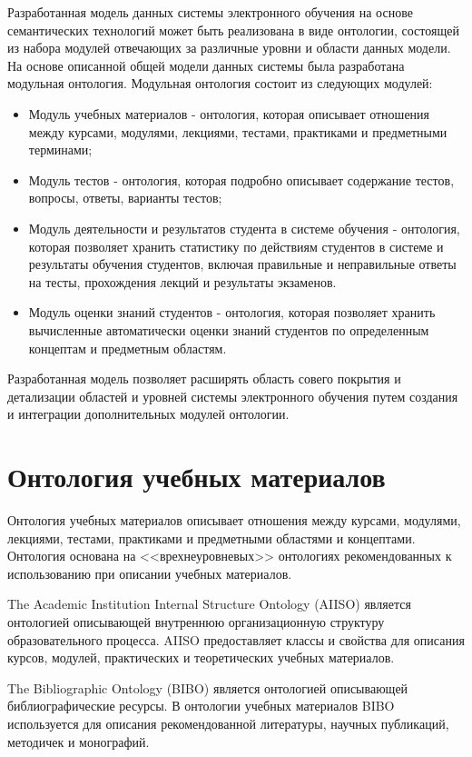 Разработанная модель данных системы электронного обучения на основе семантических технологий может быть реализована в виде онтологии, состоящей из набора модулей отвечающих за различные уровни и области данных модели. На основе описанной общей модели данных системы была разработана модульная онтология. Модульная онтология состоит из следующих модулей:

\begin{itemize}
\item Модуль учебных материалов - онтология, которая описывает отношения между курсами, модулями, лекциями, тестами, практиками и предметными терминами;
\item Модуль тестов - онтология, которая подробно описывает содержание тестов, вопросы, ответы, варианты тестов;
\item Модуль деятельности и результатов студента в системе обучения - онтология, которая позволяет хранить статистику по действиям студентов в системе и результаты обучения студентов, включая правильные и неправильные ответы на тесты, прохождения лекций и результаты экзаменов.
\item Модуль оценки знаний студентов - онтология, которая позволяет хранить вычисленные автоматически оценки знаний студентов по определенным концептам и предметным областям.
\end{itemize} 

Разработанная модель позволяет расширять область совего покрытия и детализации областей и уровней системы электронного обучения путем создания и интеграции дополнительных модулей онтологии.

\section{Онтология учебных материалов} \label{sect2_2}

Онтология учебных материалов описывает отношения между курсами, модулями, лекциями, тестами, практиками и предметными областями и концептами. Онтология основана на  <<врехнеуровневых>> онтологиях рекомендованных к использованию при описании учебных материалов.

The Academic Institution Internal Structure Ontology (AIISO) является онтологией описывающей внутреннюю организационную структуру образовательного процесса. AIISO предоставляет классы и свойства для описания курсов, модулей, практических и теоретических учебных материалов.

The Bibliographic Ontology (BIBO) является онтологией описывающей библиографические ресурсы. В онтологии учебных материалов BIBO используется для описания рекомендованной литературы, научных публикаций, методичек и монографий. 

